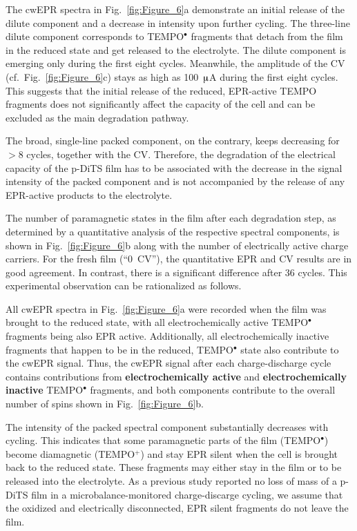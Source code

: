 \par
The cwEPR spectra in Fig.~\ref{fig:Figure_6}a demonstrate an initial release of the dilute component and a decrease in intensity upon further cycling. The three-line dilute component corresponds to TEMPO$^{\bullet}$ fragments that detach from the film in the reduced state and get released to the electrolyte. The dilute component is emerging only during the first eight cycles. Meanwhile, the amplitude of the CV (cf.\ Fig.~\ref{fig:Figure_6}c) stays as high as 100~$\muup$A during the first eight cycles. This suggests that the initial release of the reduced, EPR-active TEMPO fragments does not significantly affect the capacity of the cell and can be excluded as the main degradation pathway.

\par
The broad, single-line packed component, on the contrary, keeps decreasing for $>$8 cycles, together with the CV. Therefore, the degradation of the electrical capacity of the p-DiTS film has to be associated with the decrease in the signal intensity of the packed component and is not accompanied by the release of any EPR-active products to the electrolyte.

\par
The number of paramagnetic states in the film after each degradation step, as determined by a quantitative analysis of the respective spectral components, is shown in Fig.~\ref{fig:Figure_6}b along with the number of electrically active charge carriers. For the fresh film (``0~CV''), the quantitative EPR and CV results are in good agreement. In contrast, there is a significant difference after 36 cycles. This experimental observation can be rationalized as follows.

\par
All cwEPR spectra in Fig.~\ref{fig:Figure_6}a were recorded when the film was brought to the reduced state, with all electrochemically active TEMPO$^\bullet$ fragments being also EPR active. Additionally, all electrochemically inactive fragments that happen to be in the reduced, TEMPO$^\bullet$ state also contribute to the cwEPR signal. Thus, the cwEPR signal after each charge-discharge cycle contains contributions from \textbf{electrochemically active} and \textbf{electrochemically inactive} TEMPO$^\bullet$ fragments, and both components contribute to the overall number of spins shown in Fig.~\ref{fig:Figure_6}b.

\par
The intensity of the packed spectral component substantially decreases with cycling. This indicates that some paramagnetic parts of the film (TEMPO$^{\bullet}$) become diamagnetic (TEMPO$^{+}$) and stay EPR silent when the cell is brought back to the reduced state. These fragments may either stay in the film or to be released into the electrolyte. 
As a previous study reported no loss of mass of a p-DiTS film in a microbalance-monitored charge-discarge cycling, \cite{vereshchagin2020} we assume that the oxidized and electrically disconnected, EPR silent fragments do not leave the film.



